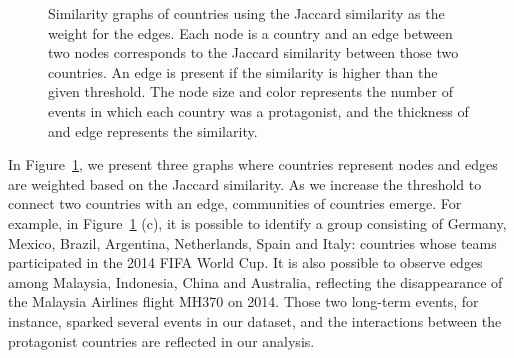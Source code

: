\begin{figure}
    \centering
    \caption[Graphs of similar countries]{Similarity graphs of countries using
    the Jaccard similarity as the weight for the edges. Each node is a country
    and an edge between two nodes corresponds to the Jaccard similarity between
    those two countries. An edge is present if the similarity is higher than the
    given threshold. The node size and color represents the number of events in
    which each country was a protagonist, and the thickness of and edge
    represents the similarity.}\label{fig:sim-graph}
\end{figure}

In Figure~\ref{fig:sim-graph}, we present three graphs where countries represent
nodes and edges are weighted based on the Jaccard similarity. 
%
As we increase the threshold to connect two countries with an edge, communities
of countries emerge. For example, in Figure~\ref{fig:sim-graph} (c), it is
possible to identify a group consisting of Germany, Mexico, Brazil, Argentina,
Netherlands, Spain and Italy: countries whose teams participated in the 2014
FIFA World Cup. 
%
It is also possible to observe edges among Malaysia, Indonesia, China and
Australia, reflecting the disappearance of the Malaysia Airlines flight MH370 on
2014. 
%
Those two long-term events, for instance, sparked several events in our dataset,
and the interactions between the protagonist countries are reflected in our
analysis.

